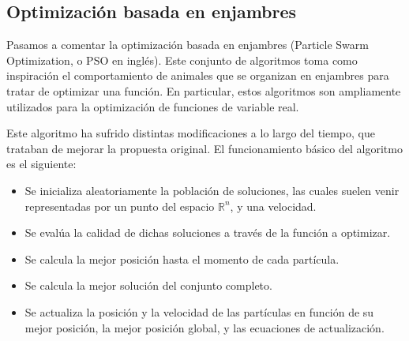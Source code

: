 \documentclass[
  a4paper,
,tablecaptionabove
]{scrartcl}
\providecommand{\tightlist}{%
  \setlength{\itemsep}{0pt}\setlength{\parskip}{0pt}}
\begin{document}
\hypertarget{optimizaciuxf3n-basada-en-enjambres}{%
\subsection{Optimización basada en
enjambres}\label{optimizaciuxf3n-basada-en-enjambres}}

Pasamos a comentar la optimización basada en enjambres (Particle Swarm
Optimization, o PSO en inglés). Este conjunto de algoritmos toma como
inspiración el comportamiento de animales que se organizan en enjambres
para tratar de optimizar una función. En particular, estos algoritmos
son ampliamente utilizados para la optimización de funciones de variable
real.

Este algoritmo ha sufrido distintas modificaciones a lo largo del
tiempo, que trataban de mejorar la propuesta original. El funcionamiento
básico del algoritmo es el siguiente:

\begin{itemize}
\tightlist
\item
  Se inicializa aleatoriamente la población de soluciones, las cuales
  suelen venir representadas por un punto del espacio \(\mathbb{R}^n\),
  y una velocidad.
\item
  Se evalúa la calidad de dichas soluciones a través de la función a
  optimizar.
\item
  Se calcula la mejor posición hasta el momento de cada partícula.
\item
  Se calcula la mejor solución del conjunto completo.
\item
  Se actualiza la posición y la velocidad de las partículas en función
  de su mejor posición, la mejor posición global, y las ecuaciones de
  actualización.
\end{itemize}
\end{document}
